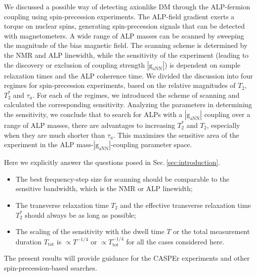 \documentclass{WileyMSP-template}
\newcommand{\DK}[1]{\textcolor{brown}{Derek: #1}}
\providecommand{\DIFaddbegin}{} %
\begin{document}
We discussed a possible way of detecting axionlike DM through the ALP-fermion coupling using spin-precession experiments. The ALP-field gradient exerts a torque on nuclear spins, generating spin-precession signals that can be detected with magnetometers. 
A wide range of ALP masses can be scanned by sweeping the magnitude of the bias magnetic field. 
The scanning scheme is determined by the NMR and ALP linewidth, while the sensitivity of the experiment (leading to the discovery or exclusion of coupling strength $|\mathrm{g_{aNN}}|$) is dependent on sample relaxation times and the ALP coherence time. We divided the discussion into four regimes for spin-precession experiments, based on the relative magnitudes of $T_2$, $T_2^*$ and $\tau_a$. For each of the regimes, we introduced the scheme of scanning and calculated the corresponding sensitivity. 
Analyzing the parameters in determining the sensitivity, we conclude that to search for ALPs with a $|\mathrm{g_{aNN}}|$ coupling over a range of ALP masses, there are advantages to increasing $T_2^*$ and $T_2$, especially when they are much shorter than $\tau_a$. This maximizes the sensitive area of the experiment in the ALP mass-$|\mathrm{g_{aNN}}|$-coupling parameter space. 

Here we explicitly answer the questions posed in Sec.\,\ref{sec:introduction}.

\begin{itemize}
\item The best frequency-step size for scanning should be comparable to the sensitive bandwidth, which is the NMR or ALP linewidth;
\item The transverse relaxation time $T_2$ and the effective transverse relaxation time $T_2^*$ should always be as long as possible;
\item The scaling of the sensitivity with the dwell time $T$ or the total measurement duration $T_{\mathrm{tot}}$ is $\propto T^{-1/4}$ or $\propto T_{\mathrm{tot}}^{-1/4}$ for all the cases considered here.
\end{itemize}

The present results will provide guidance for the CASPEr experiments and other spin-precession-based searches.
\DIFaddbegin 
\end{document}
